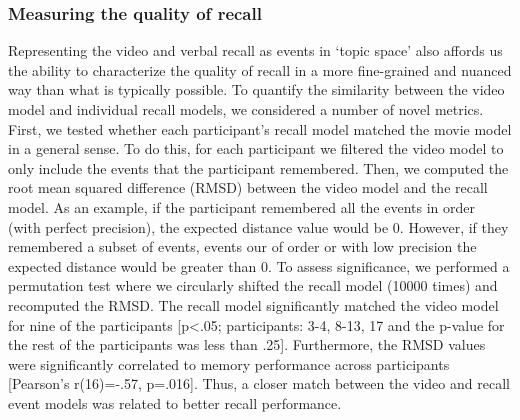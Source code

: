 \documentclass{article}
\begin{document}
{\subsubsection{Measuring the quality of recall}
Representing the video and verbal recall as events in `topic space' also affords us the ability to characterize the quality of recall in a more fine-grained and nuanced way than what is typically possible. To quantify the similarity between the video model and individual recall models, we considered a number of novel metrics.  First, we tested whether each participant's recall model matched the movie model in a general sense. To do this, for each participant we filtered the video model to only include the events that the participant remembered. Then, we computed the root mean squared difference (RMSD) between the video model and the recall model. As an example, if the participant remembered all the events in order (with perfect precision), the expected distance value would be 0. However, if they remembered a subset of events, events our of order or with low precision the expected distance would be greater than 0. To assess significance, we performed a permutation test where we circularly shifted the recall model (10000 times) and recomputed the RMSD. The recall model significantly matched the video model for nine of the participants [p<.05; participants: 3-4, 8-13, 17 and the p-value for the rest of the participants was less than .25]. Furthermore, the RMSD values were significantly correlated to memory performance across participants [Pearson's r(16)=-.57, p=.016]. Thus, a closer match between the video and recall event models was related to better recall performance.

}
\end{document}

